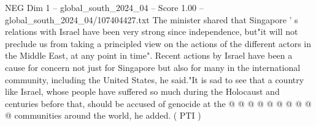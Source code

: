 \begin{textsample}{NEG Dim 1 – global\_south\_2024\_04 – Score 1.00 – global\_south\_2024\_04/107404427.txt}
The minister shared that Singapore ' s relations with Israel have been very strong since independence, but"it will not preclude us from taking a principled view on the actions of the different actors in the Middle East, at any point in time".
Recent actions by Israel have been a cause for concern not just for Singapore but also for many in the international community, including the United States, he said."It is sad to see that a country like Israel, whose people have suffered so much during the Holocaust and centuries before that, should be accused of genocide at the @ @ @ @ @ @ @ @ @ @ communities around the world, he added. ( PTI )

\end{textsample}
